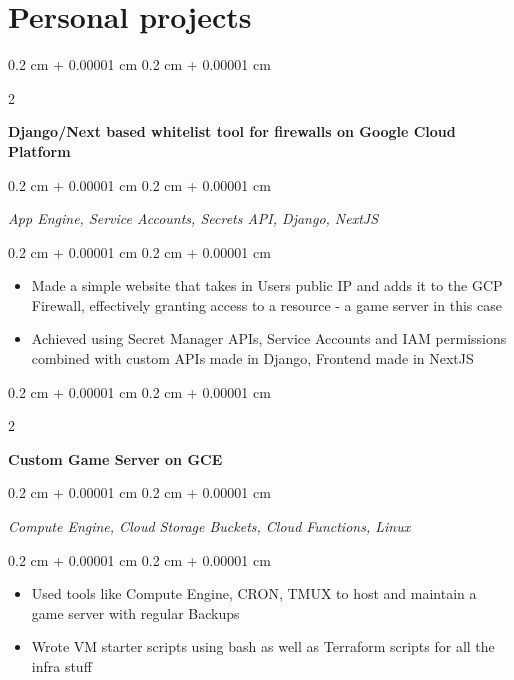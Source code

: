 \documentclass[10pt, letterpaper]{article}
\newenvironment{highlights}{
    \begin{itemize}[
        topsep=0.10 cm,
        parsep=0.10 cm,
        partopsep=0pt,
        itemsep=0pt,
        leftmargin=0.4 cm + 10pt
    ]
}{
    \end{itemize}
} %
\newenvironment{onecolentry}{
    \begin{adjustwidth}{
        0.2 cm + 0.00001 cm
    }{
        0.2 cm + 0.00001 cm
    }
}{
    \end{adjustwidth}
} %
\newenvironment{twocolentry}[2][]{
    \onecolentry
    \def\secondColumn{#2}
    \setcolumnwidth{\fill, 4.5 cm}
    \begin{paracol}{2}
}{
    \switchcolumn \raggedleft \secondColumn
    \end{paracol}
    \endonecolentry
} %
\let\hrefWithoutArrow\href
\renewcommand{\href}[2]{\hrefWithoutArrow{#1}{\ifthenelse{\equal{#2}{}}{ }{#2 }\raisebox{.15ex}{\footnotesize \faExternalLink*}}}
\begin{document}
    
    \section{Personal projects}

        \begin{twocolentry}{
          
        \textit{\href{https://github.com/apparentlyarhm/validateapp}{github}}}
            \textbf{Django/Next based whitelist tool for firewalls on Google Cloud Platform}
        \end{twocolentry}
        \begin{onecolentry}
            \textit{App Engine, Service Accounts, Secrets API, Django, NextJS}

        \end{onecolentry}

        \vspace{0.2 cm}
        \begin{onecolentry}
            \begin{highlights}
                \item {Made a simple website that takes in Users public IP and adds it to the GCP Firewall, effectively granting access to a resource - a game server in this case}
                \item {Achieved using Secret Manager APIs, Service Accounts and IAM permissions combined with custom APIs made in Django, Frontend made in NextJS}

            \end{highlights}
        \end{onecolentry}


        \vspace{0.2 cm}

        \begin{twocolentry}{
            
            
            \textit{}}
                \textbf{Custom Game Server on GCE}
            \end{twocolentry}

        \begin{onecolentry}
        \textit{Compute Engine, Cloud Storage Buckets, Cloud Functions, Linux}
        \end{onecolentry}
        \vspace{0.2 cm}
        \begin{onecolentry}
            \begin{highlights}
                \item {Used tools like Compute Engine, CRON, TMUX to host and maintain a game server with regular Backups}
                \item Wrote VM starter scripts using bash as well as Terraform scripts for all the infra stuff
            \end{highlights}
        \end{onecolentry}


        \vspace{0.2 cm}
\end{document}
